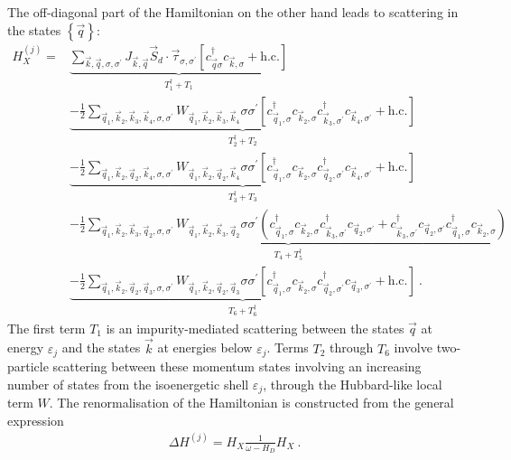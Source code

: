 \documentclass{revtex4-2}
\begin{document}
The off-diagonal part of the Hamiltonian on the other hand leads to scattering in the states \(\left\{ \vec q \right\} \):
\begin{equation}\begin{aligned}
	H_X^{(j)} =& \underbrace{\sum_{\vec k, \vec q, \sigma,\sigma^\prime}J_{\vec k, \vec q} \vec{S}_d\cdot\vec{\tau}_{\sigma,\sigma^\prime}\left[c^\dagger_{\vec q\sigma}c_{\vec k,\sigma} + \text{h.c.}\right]}_{T_1^\dagger + T_1} \\
		   &\underbrace{- \frac{1}{2}\sum_{\vec q_1,\vec k_2, \vec k_3, \vec k_4,\sigma,\sigma^\prime}W_{\vec q_1,\vec k_2,\vec k_3,\vec k_4} \sigma\sigma^\prime \left[c^\dagger_{\vec q_1,\sigma}c_{\vec k_2,\sigma}c^\dagger_{\vec k_3,\sigma^\prime}c_{\vec k_4,\sigma^\prime} + \text{h.c.}\right]}_{T_2^\dagger + T_2}\\
		   &\underbrace{- \frac{1}{2}\sum_{\vec q_1,\vec k_2, \vec q_2, \vec k_4,\sigma,\sigma^\prime}W_{\vec q_1,\vec k_2, \vec q_2, \vec k_4} \sigma\sigma^\prime \left[c^\dagger_{\vec q_1,\sigma}c_{\vec k_2,\sigma}c^\dagger_{\vec q_2,\sigma^\prime}c_{\vec k_4,\sigma^\prime} + \text{h.c.}\right]}_{T_3^\dagger + T_3}\\
		   &\underbrace{- \frac{1}{2}\sum_{\vec q_1,\vec k_2,\vec k_3,\vec q_2,\sigma,\sigma^\prime}W_{\vec q_1,\vec k_2,\vec k_3,\vec q_2} \sigma\sigma^\prime \left(c^\dagger_{\vec q_1,\sigma}c_{\vec k_2,\sigma}c^\dagger_{\vec k_3,\sigma^\prime}c_{\vec q_2,\sigma^\prime} + c^\dagger_{\vec k_3,\sigma^\prime}c_{\vec q_2,\sigma^\prime}c^\dagger_{\vec q_1,\sigma}c_{\vec k_2,\sigma}\right)}_{T_4 + T_5^\dagger}\\
		   &\underbrace{- \frac{1}{2}\sum_{\vec q_1,\vec k_2, \vec q_2, \vec q_3,\sigma,\sigma^\prime}W_{\vec q_1,\vec k_2, \vec q_2, \vec q_3} \sigma\sigma^\prime \left[c^\dagger_{\vec q_1,\sigma}c_{\vec k_2,\sigma}c^\dagger_{\vec q_2,\sigma^\prime}c_{\vec q_3,\sigma^\prime} + \text{h.c.}\right]}_{T_6 + T_6^\dagger}~.
\end{aligned}\end{equation}
The first term \(T_1\) is an impurity-mediated scattering between the states \(\vec q\) at energy \(\varepsilon_j\) and the states \(\vec k\) at energies below \(\varepsilon_j\). Terms \(T_2\) through \(T_6\) involve two-particle scattering between these momentum states involving an increasing number of states from the isoenergetic shell \(\varepsilon_j\), through the Hubbard-like local term \(W\). The renormalisation of the Hamiltonian is constructed from the general expression
\begin{equation}\begin{aligned}
	\Delta H^{(j)} = H_X \frac{1}{\omega- H_D} H_X~.
\end{aligned}\end{equation}
\end{document}
